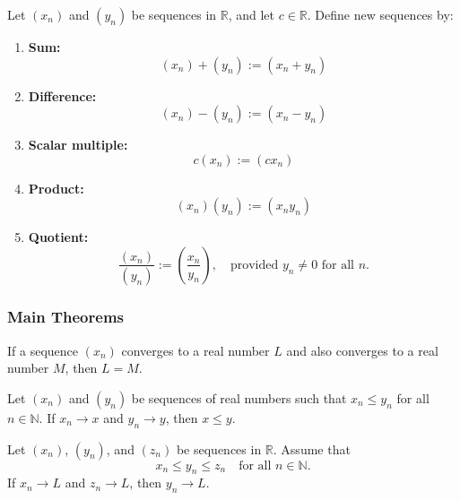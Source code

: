 \begin{tcolorbox}[colback=propbox, colframe=propborder, arc=2pt,
  left=6pt, right=6pt, top=4pt, bottom=4pt,
  title={\small\textbf{Definition (Algebraic operations)}},
  fonttitle=\small\bfseries]
Let $(x_n)$ and $(y_n)$ be sequences in $\mathbb{R}$, and let $c\in\mathbb{R}$.
Define new sequences by:
\begin{enumerate}
\item \textbf{Sum:}
\[
(x_n)+(y_n) := (x_n+y_n)
\]

\item \textbf{Difference:}
\[
(x_n)-(y_n) := (x_n-y_n)
\]

\item \textbf{Scalar multiple:}
\[
c(x_n) := (c x_n)
\]

\item \textbf{Product:}
\[
(x_n)(y_n) := (x_n y_n)
\]

\item \textbf{Quotient:}
\[
\frac{(x_n)}{(y_n)} := \left(\frac{x_n}{y_n}\right),
\quad \text{provided } y_n \neq 0 \text{ for all } n.
\]
\end{enumerate}
\end{tcolorbox}

\subsubsection{Main Theorems}

\begin{theorem}
If a sequence $(x_n)$ converges to a real number $L$ and also converges to a real
number $M$, then $L = M$.
\end{theorem}



\begin{theorem}
Let $(x_n)$ and $(y_n)$ be sequences of real numbers such that $x_n \le y_n$ for
all $n \in \mathbb{N}$. If $x_n \to x$ and $y_n \to y$, then $x \le y$.
\end{theorem}



\begin{theorem}
Let $(x_n)$, $(y_n)$, and $(z_n)$ be sequences in $\mathbb{R}$.
Assume that
\[
x_n \le y_n \le z_n
\quad\text{for all } n\in\mathbb{N}.
\]
If $x_n \to L$ and $z_n \to L$, then $y_n \to L$.
\end{theorem}



